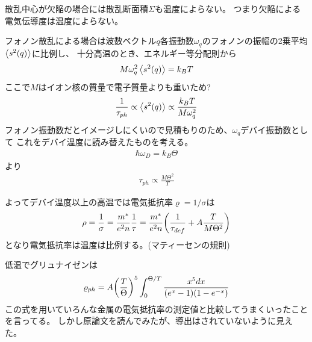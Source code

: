 \documentclass[11pt,dvipdfmx,a4paper]{jsarticle}
\begin{document}
散乱中心が欠陥の場合には散乱断面積\(\Sigma\)も温度によらない。
つまり欠陥による電気伝導度は温度によらない。

フォノン散乱による場合は波数ベクトル\(q\)各振動数\(\omega_q\)のフォノンの振幅の2乗平均
\(\ev{s^2(q)}\)に比例し、%
十分高温のとき、エネルギー等分配則から
\begin{align}
    M\omega_q^2\ev{s^2(q)} = k_BT %
\end{align}
ここで\(M\)はイオン核の質量で電子質量よりも重いため?
\begin{align}
    \frac{1}{\tau_{ph}}\propto \ev{s^2(q)}\propto \frac{k_BT}{M\omega_q^2} %
\end{align}
フォノン振動数だとイメージしにくいので見積もりのため、\(\omega_q\)デバイ振動数として
これをデバイ温度に読み替えたものを考える。
\begin{align}
    \hbar \omega_D = k_B \Theta
\end{align}
より
\begin{align}
    \tau_{ph} \propto \frac{M\Theta^2}{T} %
\end{align}

よってデバイ温度以上の高温では電気抵抗率\(\varrho=1/\sigma\)は
\begin{align}
    \rho = \frac{1}{\sigma} = \frac{m^*}{e^2n} \frac{1}{\tau}
    = \frac{m^*}{e^2n} \qty(\frac{1}{\tau_{def}} + A\frac{T}{M\Theta^2})
\end{align}
となり電気抵抗率は温度は比例する。(マティーセンの規則)

低温でグリュナイゼン\cite{Grueneisen}は
\begin{align}
    \varrho_{ph}=A\qty(\frac{T}{\Theta})^5\int_0^{\Theta/T} \frac{x^5dx}{(e^x-1)(1-e^{-x})} %
\end{align}
この式を用いていろんな金属の電気抵抗率の測定値と比較してうまくいったことを言ってる。
しかし原論文を読んでみたが、導出はされていないように見えた。
\end{document}
